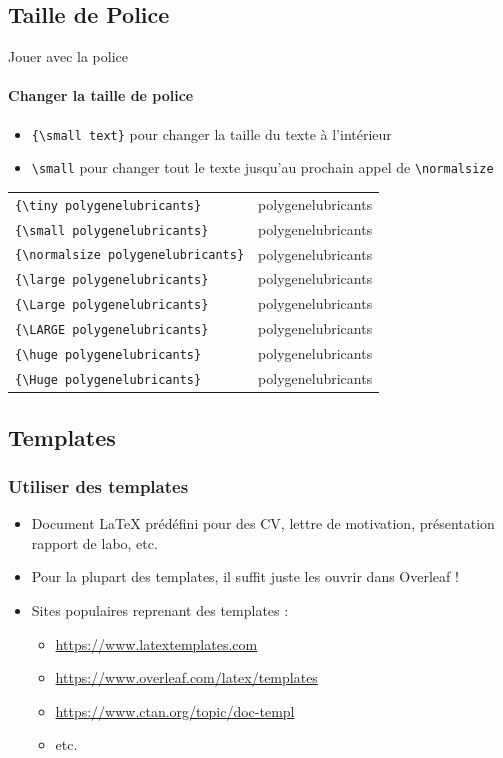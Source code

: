 \subsection{Taille de Police}

\begin{frame}[fragile]{Jouer avec la police}
  \framesubtitle{Changer la taille de police}
  \begin{itemize}
      \item \lstinline|{\small text}| pour changer la taille du texte à l'intérieur
      \item \lstinline|\small| pour changer tout le texte jusqu'au prochain appel de \lstinline|\normalsize|
  \end{itemize}
  \begin{tabular}{ll}
  \lstinline|{\tiny polygenelubricants}| & {\tiny polygenelubricants} \\
  \lstinline|{\small polygenelubricants}| & {\small polygenelubricants} \\
  \lstinline|{\normalsize polygenelubricants}| & {\normalsize polygenelubricants} \\
  \lstinline|{\large polygenelubricants}| & {\large polygenelubricants} \\
  \lstinline|{\Large polygenelubricants}| & {\Large polygenelubricants} \\
  \lstinline|{\LARGE polygenelubricants}| & {\LARGE polygenelubricants} \\
  \lstinline|{\huge polygenelubricants}| & {\huge polygenelubricants} \\
  \lstinline|{\Huge polygenelubricants}| & {\Huge polygenelubricants} \\
  \end{tabular}
\end{frame}

\subsection{Templates}

\begin{frame}[fragile]
  \frametitle{Utiliser des templates}
  \begin{itemize}
    \item Document \LaTeX{} prédéfini pour des CV, lettre de motivation, présentation rapport de labo, etc.
    \item Pour la plupart des templates, il suffit juste les ouvrir dans Overleaf !
    \item Sites populaires reprenant des templates :
      \begin{itemize}
        \item \url{https://www.latextemplates.com}
        \item \url{https://www.overleaf.com/latex/templates}
        \item \url{https://www.ctan.org/topic/doc-templ}
        \item etc.
      \end{itemize}
  \end{itemize}
\end{frame}

